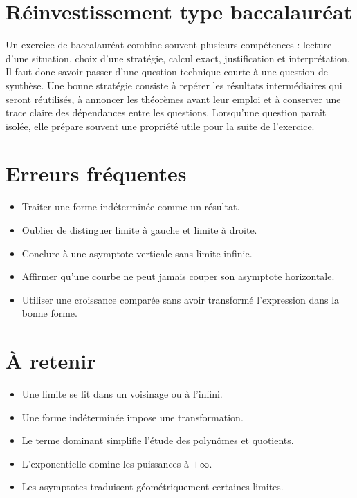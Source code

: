 \section{Réinvestissement type baccalauréat}
Un exercice de baccalauréat combine souvent plusieurs compétences : lecture d'une situation, choix d'une stratégie, calcul exact, justification et interprétation. Il faut donc savoir passer d'une question technique courte à une question de synthèse. Une bonne stratégie consiste à repérer les résultats intermédiaires qui seront réutilisés, à annoncer les théorèmes avant leur emploi et à conserver une trace claire des dépendances entre les questions. Lorsqu'une question paraît isolée, elle prépare souvent une propriété utile pour la suite de l'exercice.

\section{Erreurs fréquentes}
\begin{itemize}
\item Traiter une forme indéterminée comme un résultat.
\item Oublier de distinguer limite à gauche et limite à droite.
\item Conclure à une asymptote verticale sans limite infinie.
\item Affirmer qu’une courbe ne peut jamais couper son asymptote horizontale.
\item Utiliser une croissance comparée sans avoir transformé l’expression dans la bonne forme.
\end{itemize}

\section{À retenir}
\begin{aretenir}
\begin{itemize}
\item Une limite se lit dans un voisinage ou à l’infini.
\item Une forme indéterminée impose une transformation.
\item Le terme dominant simplifie l’étude des polynômes et quotients.
\item L’exponentielle domine les puissances à $+\infty$.
\item Les asymptotes traduisent géométriquement certaines limites.
\end{itemize}
\end{aretenir}
